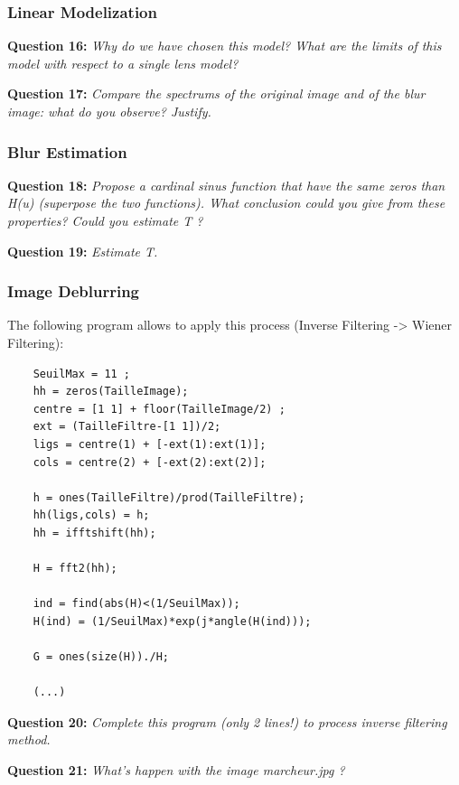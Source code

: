 \subsubsection{Linear Modelization}
\textbf{Question 16:}
\textit{Why do we have chosen this model? What are the limits of this model with respect to a single lens model?}

\TODO{}

\textbf{Question 17:}
\textit{Compare the spectrums of the original image and of the blur image: what do you observe? Justify.}

\TODO{}

\subsubsection{Blur Estimation}
\textbf{Question 18:}
\textit{Propose a cardinal sinus function that have the same zeros than H(u) (superpose the two functions). What conclusion could you give from these properties? Could you estimate T ?}

\TODO{}

\textbf{Question 19:}
\textit{Estimate T.}

\TODO{}


\subsubsection{Image Deblurring}

The following program allows to apply this process (Inverse Filtering -> Wiener Filtering):
\begin{lstlisting}
    SeuilMax = 11 ;
    hh = zeros(TailleImage);
    centre = [1 1] + floor(TailleImage/2) ;
    ext = (TailleFiltre-[1 1])/2;
    ligs = centre(1) + [-ext(1):ext(1)];
    cols = centre(2) + [-ext(2):ext(2)];
    
    h = ones(TailleFiltre)/prod(TailleFiltre);
    hh(ligs,cols) = h;
    hh = ifftshift(hh);
    
    H = fft2(hh);
    
    ind = find(abs(H)<(1/SeuilMax));
    H(ind) = (1/SeuilMax)*exp(j*angle(H(ind)));
    
    G = ones(size(H))./H;
    
    (...)
\end{lstlisting}


\textbf{Question 20:}
\textit{Complete this program (only 2 lines!) to process inverse ﬁltering method.}

\TODO{}

\textbf{Question 21:}
\textit{What’s happen with the image marcheur.jpg ?}

\TODO{}